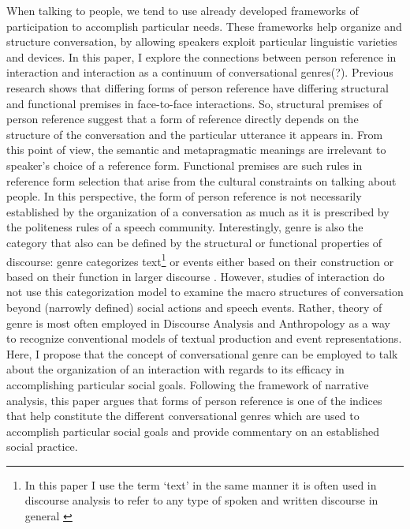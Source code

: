 \documentclass[12pt]{article}
\begin{document}
When talking to people, we tend to use already developed frameworks of participation \autocite{goodwin2005} to accomplish particular needs. These frameworks help organize and structure conversation, by allowing speakers exploit particular linguistic varieties and devices. In this paper, I explore the connections between person reference in interaction and interaction as a continuum of conversational genres(?). Previous research shows that differing forms of person reference have differing structural and functional premises in face-to-face interactions. So, structural premises of person reference suggest that a form of reference directly depends on the structure of the conversation and the particular utterance it appears in. From this point of view, the semantic and metapragmatic meanings are irrelevant to speaker's choice of a reference form. Functional premises are such rules in reference form selection that arise from the cultural constraints on talking about people. In this perspective, the form of person reference is not necessarily established by the organization of a conversation as much as it is prescribed by the politeness rules of a speech community. Interestingly, genre is also the category that also can be defined by the structural or functional properties of discourse: genre categorizes text\footnote{In this paper I use the term `text' in the same manner it is often used in discourse analysis to refer to any type of spoken and written discourse in general \parencite{cameron2014}} or events either based on their construction or based on their function in larger discourse \parencite{georgakopoulou2000, swales1990, briggs1992}. However, studies of interaction do not use this categorization model to examine the macro structures of conversation beyond (narrowly defined) social actions and speech events. Rather, theory of genre is most often employed in Discourse Analysis and Anthropology as a way to recognize conventional models of textual production and event representations. Here, I propose that the concept of conversational genre can be employed to talk about the organization of an interaction with regards to its efficacy in accomplishing particular social goals. Following the \textcite{georgakopoulou2000} framework of narrative analysis, this paper argues that forms of person reference is one of the indices that help constitute the different conversational genres which are used to accomplish particular social goals and provide commentary on an established social practice.
\end{document}

